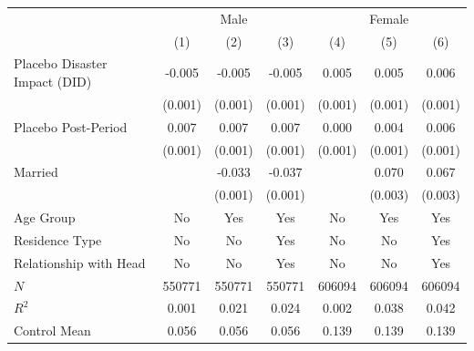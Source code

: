 \documentclass[serif, aspectratio=169]{beamer}
\begin{document}
\begin{frame}[label=nonregular_placebo]
\begin{table}[htbp]
\begin{tabular}{@{}l*{6}{c}@{}}
          &\multicolumn{3}{c}{Male}                                &\multicolumn{3}{c}{Female}                              \\\cmidrule(lr){2-4}\cmidrule(lr){5-7}
          &\multicolumn{1}{c}{(1)}         &\multicolumn{1}{c}{(2)}         &\multicolumn{1}{c}{(3)}         &\multicolumn{1}{c}{(4)}         &\multicolumn{1}{c}{(5)}         &\multicolumn{1}{c}{(6)}         \\
\toprule
Placebo Disaster Impact (DID)&   -0.005\sym{***}&   -0.005\sym{***}&   -0.005\sym{***}&    0.005\sym{***}&    0.005\sym{***}&    0.006\sym{***}\\
          &  (0.001)         &  (0.001)         &  (0.001)         &  (0.001)         &  (0.001)         &  (0.001)         \\
\addlinespace
Placebo Post-Period&    0.007\sym{***}&    0.007\sym{***}&    0.007\sym{***}&    0.000         &    0.004\sym{***}&    0.006\sym{***}\\
          &  (0.001)         &  (0.001)         &  (0.001)         &  (0.001)         &  (0.001)         &  (0.001)         \\
\addlinespace
Married   &                  &   -0.033\sym{***}&   -0.037\sym{***}&                  &    0.070\sym{***}&    0.067\sym{***}\\
          &                  &  (0.001)         &  (0.001)         &                  &  (0.003)         &  (0.003)         \\
\midrule
Age Group &       No         &      Yes         &      Yes         &       No         &      Yes         &      Yes         \\
Residence Type&       No         &       No         &      Yes         &       No         &       No         &      Yes         \\
Relationship with Head&       No         &       No         &      Yes         &       No         &       No         &      Yes         \\
$\textit{N}$&   550771         &   550771         &   550771         &   606094         &   606094         &   606094         \\
$\textit{R}^2$&    0.001         &    0.021         &    0.024         &    0.002         &    0.038         &    0.042         \\
Control Mean&    0.056         &    0.056         &    0.056         &    0.139         &    0.139         &    0.139         \\

\end{tabular}
\end{table}
\end{frame}
\end{document}
